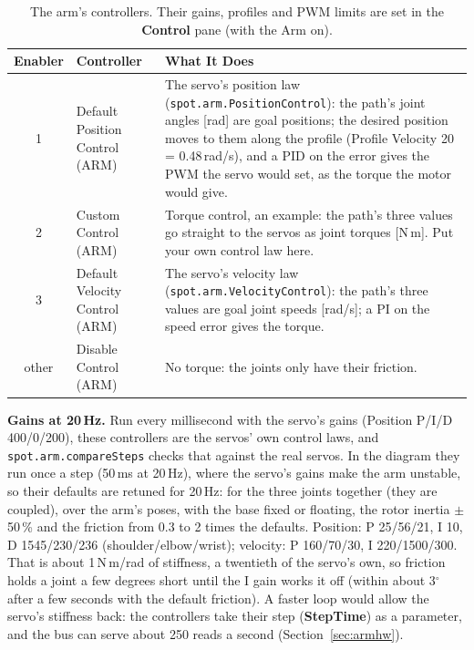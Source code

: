 \documentclass[11pt,a4paper]{article}
\newcommand{\ui}[1]{\textsf{\textbf{#1}}}
\newcommand{\fn}[1]{\texttt{#1}}
\begin{document}
\begin{table}[h]
\centering\small
\begin{tabular}{@{}c >{\raggedright\arraybackslash}p{3.5cm} >{\raggedright\arraybackslash}p{9.3cm}@{}}
\toprule
\textbf{Enabler} & \textbf{Controller} & \textbf{What It Does} \\ \midrule
1 & Default Position Control (ARM) & The servo's position law (\fn{spot.arm.PositionControl}): the path's joint angles
                                     [rad] are goal positions; the desired position moves to them along the profile
                                     (Profile Velocity 20 = 0.48\,rad/s), and a PID on the error gives the PWM the servo
                                     would set, as the torque the motor would give. \\
2 & Custom Control (ARM) & Torque control, an example: the path's three values go straight to the servos as joint
                           torques [N\,m]. Put your own control law here. \\
3 & Default Velocity Control (ARM) & The servo's velocity law (\fn{spot.arm.VelocityControl}): the path's three values
                                     are goal joint speeds [rad/s]; a PI on the speed error gives the torque. \\
other & Disable Control (ARM) & No torque: the joints only have their friction. \\
\bottomrule
\end{tabular}
\caption{The arm's controllers. Their gains, profiles and PWM limits are set in the \ui{Control} pane (with the Arm on).}\label{tab:armctl}
\end{table}

\textbf{Gains at 20\,Hz.} Run every millisecond with the servo's gains (Position P/I/D 400/0/200), these controllers are
the servos' own control laws, and \fn{spot.arm.compareSteps} checks that against the real servos. In the diagram they
run once a step (50\,ms at 20\,Hz), where the servo's gains make the arm unstable, so their defaults are retuned for
20\,Hz: for the three joints together (they are coupled), over the arm's poses, with the base fixed or floating, the
rotor inertia $\pm$50\,\% and the friction from 0.3 to 2 times the defaults. Position: P 25/56/21, I 10, D 1545/230/236
(shoulder/elbow/wrist); velocity: P 160/70/30, I 220/1500/300. That is about 1\,N\,m/rad of stiffness, a twentieth of
the servo's own, so friction holds a joint a few degrees short until the I gain works it off (within about 3$^\circ$
after a few seconds with the default friction). A faster loop would allow the servo's stiffness back: the controllers
take their step (\ui{StepTime}) as a parameter, and the bus can serve about 250 reads a second
(Section~\ref{sec:armhw}).
\end{document}
